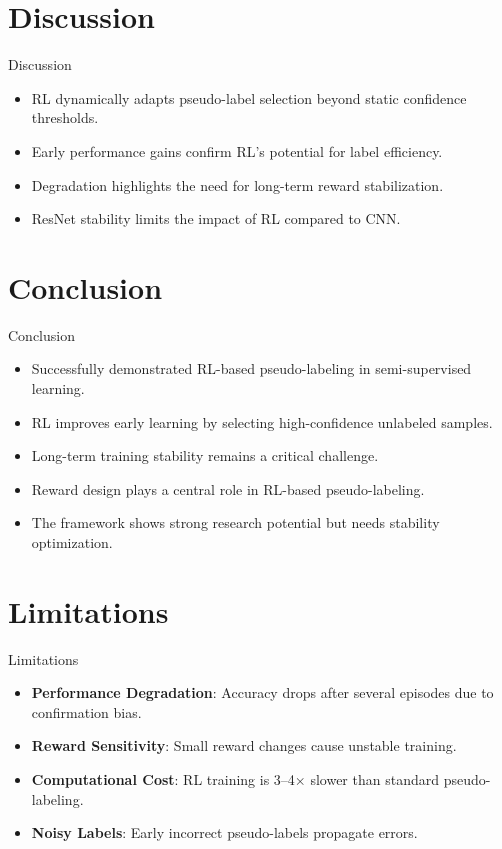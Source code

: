 \documentclass{beamer}
\begin{document}

\section{Discussion}
\begin{frame}{Discussion}
  \begin{itemize}
    \item RL dynamically adapts pseudo-label selection beyond static confidence thresholds.
    \item Early performance gains confirm RL’s potential for label efficiency.
    \item Degradation highlights the need for long-term reward stabilization.
    \item ResNet stability limits the impact of RL compared to CNN.
  \end{itemize}
\end{frame}


\section{Conclusion}
\begin{frame}{Conclusion}
  \begin{itemize}
    \item Successfully demonstrated RL-based pseudo-labeling in semi-supervised learning.
    \item RL improves early learning by selecting high-confidence unlabeled samples.
    \item Long-term training stability remains a critical challenge.
    \item Reward design plays a central role in RL-based pseudo-labeling.
    \item The framework shows strong research potential but needs stability optimization.
  \end{itemize}
\end{frame}


\section{Limitations}
\begin{frame}{Limitations}
  \begin{itemize}
    \item \textbf{Performance Degradation}: Accuracy drops after several episodes due to confirmation bias.
    \item \textbf{Reward Sensitivity}: Small reward changes cause unstable training.
    \item \textbf{Computational Cost}: RL training is 3--4$\times$ slower than standard pseudo-labeling.
    \item \textbf{Noisy Labels}: Early incorrect pseudo-labels propagate errors.
  \end{itemize}
\end{frame}
\end{document}
